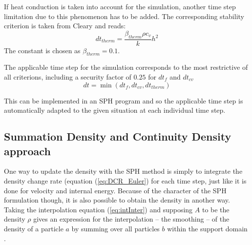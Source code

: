 \documentclass[11pt,a4paper,twoside]{report}
\begin{document}
If  heat conduction is taken into account for the simulation, another time step limitation due to this phenomenon has to be added. The corresponding stability criterion is taken from Cleary \cite{Cleary1999} and reads:
\begin{equation}
 \label{eq:dt_limitation_thermal}
dt_\mathit{therm}=\frac{\beta_\mathit{therm}\rho c_v}{k} h^2
\end{equation}
The constant is chosen as $\beta_\mathit{therm}=0.1$.


The applicable time step for the simulation corresponds to the most restrictive of all criterions, including a security factor of $0.25$ for $dt_f$ and $dt_{cv}$ 
\begin{equation}
\label{eq:dt}
dt=\min(dt_f,dt_{cv},dt_\mathit{therm})
\end{equation}

This can be implemented in an SPH program and so the applicable time step is automatically adapted to the given situation at each individual time step.
 





\subsection{Summation Density and Continuity Density approach}
\label{sec:DensCalcMode}
One way to update the density with the SPH method is simply to integrate the density change rate (equation (\ref{eq:DCR_Euler}) for each time step, just like it is done for velocity and internal energy. Because of the character of the SPH formulation though, it is also possible to obtain the density in another way. Taking the interpolation equation (\ref{eq:intInter}) and supposing $A$ to be the density $\rho$ gives an expression for the interpolation -- the smoothing -- of the density of a particle $a$ by summing over 
all particles $b$ within the support domain \cite{Monaghan2005}.
\end{document}
